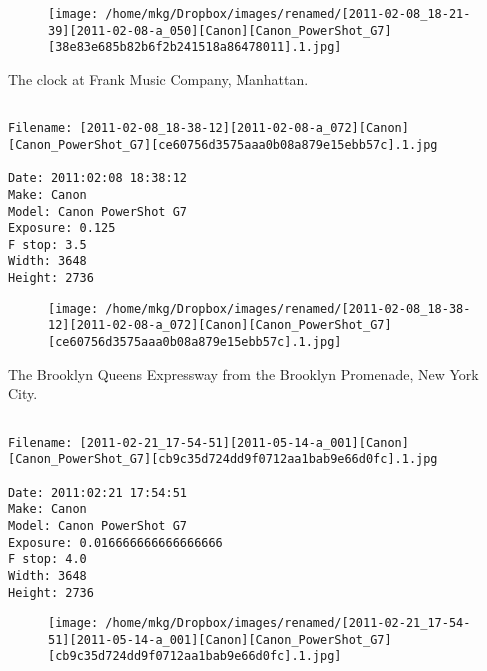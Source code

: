 \begin{figure}
\texttt{[image: /home/mkg/Dropbox/images/renamed/[2011-02-08\_18-21-39][2011-02-08-a\_050][Canon][Canon\_PowerShot\_G7][38e83e685b82b6f2b241518a86478011].1.jpg]}
\end{figure}
    
\clearpage
\onecolumn
\noindent The clock at Frank Music Company, Manhattan.
\noindent
\begin{lstlisting}

Filename: [2011-02-08_18-38-12][2011-02-08-a_072][Canon][Canon_PowerShot_G7][ce60756d3575aaa0b08a879e15ebb57c].1.jpg

Date: 2011:02:08 18:38:12
Make: Canon
Model: Canon PowerShot G7
Exposure: 0.125
F stop: 3.5
Width: 3648
Height: 2736
\end{lstlisting}
\clearpage

\begin{figure}
\texttt{[image: /home/mkg/Dropbox/images/renamed/[2011-02-08\_18-38-12][2011-02-08-a\_072][Canon][Canon\_PowerShot\_G7][ce60756d3575aaa0b08a879e15ebb57c].1.jpg]}
\end{figure}
    
\clearpage
\onecolumn
\noindent The Brooklyn Queens Expressway from the Brooklyn Promenade, New York City.
\noindent
\begin{lstlisting}

Filename: [2011-02-21_17-54-51][2011-05-14-a_001][Canon][Canon_PowerShot_G7][cb9c35d724dd9f0712aa1bab9e66d0fc].1.jpg

Date: 2011:02:21 17:54:51
Make: Canon
Model: Canon PowerShot G7
Exposure: 0.016666666666666666
F stop: 4.0
Width: 3648
Height: 2736
\end{lstlisting}
\clearpage

\begin{figure}
\texttt{[image: /home/mkg/Dropbox/images/renamed/[2011-02-21\_17-54-51][2011-05-14-a\_001][Canon][Canon\_PowerShot\_G7][cb9c35d724dd9f0712aa1bab9e66d0fc].1.jpg]}
\end{figure}
    
